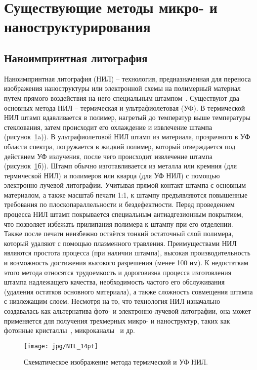 \section{Существующие методы микро- и наноструктурирования}

\subsection{Наноимпринтная литография}
Наноимпринтная литография (НИЛ) -- технология, предназначенная для переноса изображения наноструктуры или электронной схемы на полимерный материал путем прямого воздействия на него специальным штампом~\cite{NIL_1, NIL_2}. Существуют два основных метода НИЛ -- термическая и ультрафиолетовая (УФ). В термической НИЛ штамп вдавливается в полимер, нагретый до температур выше температуры стеклования, затем происходит его охлаждение и извлечение штампа (рисунок~\ref{fig:NIL}a)). В ультрафиолетовой НИЛ штамп из материала, прозрачного в УФ области спектра, погружается в жидкий полимер, который отверждается под действием УФ излучения, после чего происходит извлечение штампа (рисунок~\ref{fig:NIL}б)). Штамп обычно изготавливается из металла или кремния (для термической НИЛ) и полимеров или кварца (для УФ НИЛ) с помощью электронно-лучевой литографии. Учитывая прямой контакт штампа с основным материалом, а также масштаб печати 1:1, к штампу предъявляются повышенные требования по плоскопараллельности и бездефектности.  Перед проведением процесса НИЛ штамп покрывается специальным антиадгезионным покрытием, что позволяет избежать прилипания полимера к штампу при его отделении. Также после печати неизбежно остаётся тонкий остаточный слой полимера, который удаляют с помощью плазменного травления. Преимуществами НИЛ являются простота процесса (при наличии штампа), высокая производительность и возможность достижения высокого разрешения (менее 100 нм). К недостаткам этого метода относятся трудоемкость и дороговизна процесса изготовления штампа надлежащего качества, необходимость частого его обслуживания (удаления остатков основного материала), а также сложность совмещения штампа с низлежащим слоем. Несмотря на то, что технология НИЛ изначально создавалась как альтернатива фото- и электронно-лучевой литографии, она может применяется для получения трехмерных микро- и наноструктур, таких как фотонные кристаллы~\cite{NIL_nanophotonics}, микроканалы~\cite{NIL_microfluidics} и др.~\cite{NIL_3D_1, NIL_3D_2}

\begin{figure}
	\centering
	\texttt{[image: jpg/NIL\_14pt]}
	\caption{Схематическое изображение метода термической и УФ НИЛ.}
	\label{fig:NIL}
\end{figure}


